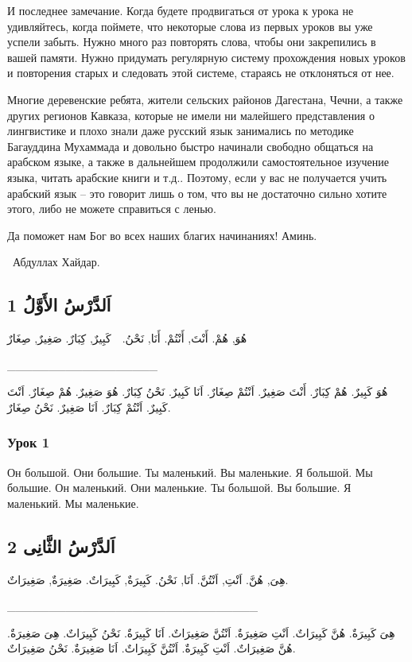 \documentclass[a5paper]{article}
\begin{document}
И последнее замечание. Когда будете продвигаться от урока к урока не удивляйтесь, когда поймете, что некоторые слова из первых уроков вы уже успели забыть. Нужно много раз повторять слова, чтобы они закрепились в вашей памяти. Нужно придумать регулярную систему прохождения новых уроков и повторения старых и следовать этой системе, стараясь не отклоняться от нее.

Многие деревенские ребята, жители сельских районов Дагестана, Чечни, а также других регионов Кавказа, которые не имели ни малейшего представления о лингвистике и плохо знали даже русский язык занимались по методике Багауддина Мухаммада и довольно быстро начинали свободно общаться на арабском языке, а также в дальнейшем продолжили самостоятельное изучение языка, читать арабские книги и т.д.. Поэтому, если у вас не получается учить арабский язык – это говорит лишь о том, что вы не достаточно сильно хотите этого, либо не можете справиться с ленью. 

Да поможет нам Бог во всех наших благих начинаниях! Аминь. 

\ Абдуллах Хайдар.

\subsection{اَلدَّرْسُ الأَوَّلُ 1}
هُوَ, هُمْ. أَنْتَ, أَنْتُمْ. أَنَا, نَحْنُ.\ \  كَبِيرٌ, كِبَارٌ. صَغِيرٌ, صِغَارٌ

\_\_\_\_\_\_\_\_\_\_\_\_\_\_\_\_\_\_

هُوَ كَبِيرٌ. هُمْ كِبَارٌ. أَنْتَ صَغِيرٌ. اَنْتُمْ صِغَارٌ. اَنَا كَبِيرٌ. نَحْنُ كِبَارٌ. هُوَ صَغِيرٌ. هُمْ صِغَارٌ. اَنْتَ كَبِيرٌ. اَنْتُمْ كِبَارٌ. اَنَا صَغِيرٌ. نَحْنُ صِغَارٌ.

\subsubsection{Урок 1}
Он большой. Они большие. Ты маленький. Вы маленькие. Я большой. Мы большие. Он маленький. Они маленькие. Ты большой. Вы большие. Я маленький. Мы маленькие.

\subsection{اَلدَّرْسُ الثَّانِى 2}
هِىَ, هُنَّ. اَنْتِ, اَنْتُنَّ. اَنَا, نَحْنُ. كَبِيرَةٌ, كَبِيرَاتٌ. صَغِيرَةٌ, صَغِيرَاتٌ.

\_\_\_\_\_\_\_\_\_\_\_\_\_\_\_\_\_\_\_\_\_\_\_\_\_\_\_\_\_\_

هِىَ كَبِيرَةٌ. هُنَّ كَبِيرَاتٌ. اَنْتِ صَغِيرَةٌ. اَنْتُنَّ صَغِيرَاتٌ. اَنَا كَبِيرَةٌ. نَحْنُ كَبِيرَاتٌ. هِىَ صَغِيرَةٌ. هُنَّ صَغِيرَاتٌ. اَنْتِ كَبِيرَةٌ. اَنْتُنَّ كَبِيرَاتٌ. اَنَا صَغِيرَةٌ. نَحْنُ صَغِيرَاتٌ.
\end{document}
